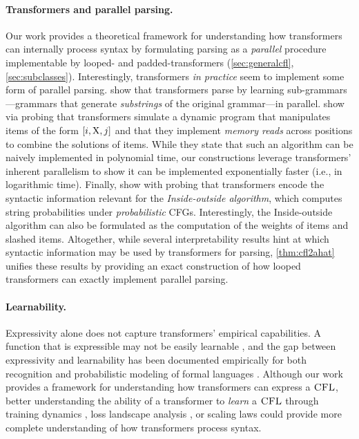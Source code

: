 \documentclass{article}
\begin{document}
\paragraph{Transformers and parallel parsing.}
Our work provides a theoretical framework for understanding how transformers can internally process syntax by formulating parsing as a \emph{parallel} procedure implementable by looped- and padded-transformers (\cref{sec:generalcfl}, \cref{sec:subclasses}).
Interestingly, transformers \emph{in practice} seem to implement some form of parallel parsing. 
\citet{schulz2025unravelingsyntaxlanguagemodels} show that transformers parse by learning sub-grammars---grammars that generate \emph{substrings} of the original grammar---in parallel.
\citet{allen-zhu2025physics} show via probing that transformers simulate a dynamic program that manipulates items of the form $[{{ i}}, {{ \mathrm{X}}}, {{ j}}]$ and that they implement \emph{memory reads} across positions to combine the solutions of items.
While they state that such an algorithm can be naively implemented in polynomial time, our constructions leverage transformers' inherent parallelism to show it can be implemented exponentially faster (i.e., in logarithmic time).
Finally, \citet{zhao-etal-2023-transformers} show with probing that transformers encode the syntactic information relevant for the \emph{Inside-outside algorithm}, which computes string probabilities under \emph{probabilistic} CFGs.
Interestingly, the Inside-outside algorithm can also be formulated as the computation of the weights of items and slashed items. 
Altogether, while several interpretability results hint at which syntactic information may be used by transformers for parsing, \cref{thm:cfl2ahat} unifies these results by providing an exact construction of how looped transformers can exactly implement parallel parsing.

\paragraph{Learnability.}
Expressivity alone does not capture transformers' empirical capabilities.
A function that is expressible may not be easily learnable \citep{hahn-rofin-2024-sensitive}, and the gap between expressivity and learnability has been documented empirically for both recognition \citep{butoi2025trainingneuralnetworksrecognizers} and probabilistic modeling of formal languages \citep{borenstein-etal-2024-languages}.
Although our work provides a framework for understanding how transformers can express a ${\textsc{CFL}}$, better understanding the ability of a transformer to \emph{learn} a ${\textsc{CFL}}$ through training dynamics \citep{huang2025how}, loss landscape analysis \citep{hahn-rofin-2024-sensitive}, or scaling laws \citep{merrill2026olmohybridtheorypractice} could provide more complete understanding of how transformers process syntax. 
\end{document}
